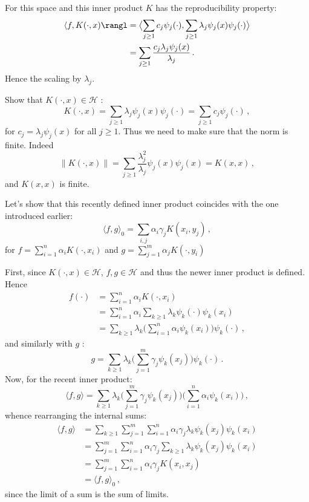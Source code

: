 \documentclass[a4paper]{article}
\newcommand{\Hcal}{\mathcal{H}}
\begin{document}
For this space and this inner product $K$ has the reproducibility property:
\begin{align*}
	\langle f, K(\cdot,x)\rangl
	&= \bigl\langle \sum_{j\geq1}c_j \psi_j(\cdot), \sum_{j\geq1} \lambda_j \psi_j(x) \psi_j(\cdot) \bigr\rangle\\
	&= \sum_{j\geq1} \frac{c_j \lambda_j \psi_j(x) }{\lambda_j}\,.
\end{align*}
Hence the scaling by $\lambda_j$.

Show that $K(\cdot, x)\in \Hcal$ :
\[
K(\cdot, x)
= \sum_{j\geq1} \lambda_j \psi_j(x) \psi_j(\cdot)
= \sum_{j\geq1} c_j \psi_j(\cdot)\,,
\]
for $c_j = \lambda_j \psi_j(x)$ for all $j\geq1$. Thus we need to make sure that the norm is finite.
Indeed
\[ \|K(\cdot,x)\| = \sum_{j\geq1} \frac{\lambda_j^2}{\lambda_j} \psi_j(x) \psi_j(x) = K(x,x) \,, \]
and $K(x,x)$ is finite.

Let's show that this recently defined inner product coincides with the one introduced earlier:
\[
\langle f,g\rangle_0 = \sum_{i,j} \alpha_i \gamma_j K(x_i, y_j) \,,
\]
for $f = \sum_{i=1}^n \alpha_i K(\cdot, x_i)$ and $g = \sum_{j=1}^m \alpha_j K(\cdot, y_i)$

First, since $K(\cdot, x)\in \Hcal$, $f,g\in \Hcal$ and thus the newer inner product is defined.
Hence
\begin{align*}
	f(\cdot) &= \sum_{i=1}^n \alpha_i K(\cdot, x_i)\\
	&= \sum_{i=1}^n \alpha_i \sum_{k\geq1} \lambda_k \psi_k(\cdot) \psi_k(x_i)\\
	&= \sum_{k\geq1} \lambda_k \bigl(\sum_{i=1}^n \alpha_i \psi_k(x_i)\bigr) \psi_k(\cdot)\,,
\end{align*}
and similarly with $g$ :
\[
g = \sum_{k\geq1} \lambda_k \bigl(\sum_{j=1}^m \gamma_j \psi_k(x_j)\bigr) \psi_k(\cdot)\,.
\]
Now, for the recent inner product:
\[
\langle f,g\rangle
= \sum_{k\geq1} \lambda_k \bigl(\sum_{j=1}^m \gamma_j \psi_k(x_j)\bigr) \bigl(\sum_{i=1}^n \alpha_i \psi_k(x_i)\bigr)\,,
\]
whence rearranging the internal sums:
\begin{align*}
	\langle f,g\rangle
	&= \sum_{k\geq1} \sum_{j=1}^m \sum_{i=1}^n \alpha_i \gamma_j \lambda_k \psi_k(x_j) \psi_k(x_i) \\
	&= \sum_{j=1}^m \sum_{i=1}^n \alpha_i \gamma_j \sum_{k\geq1} \lambda_k \psi_k(x_j) \psi_k(x_i) \\
	&= \sum_{j=1}^m \sum_{i=1}^n \alpha_i \gamma_j K(x_i,x_j) \\
	&= \langle f,g\rangle_0 \,,
\end{align*}
since the limit of a sum is the sum of limits.
\end{document}
